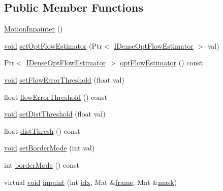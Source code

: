 \subsection*{Public Member Functions}
\begin{DoxyCompactItemize}
\item 
\hyperlink{classcv_1_1videostab_1_1MotionInpainter_aebf592dca89ac5e3f3cf94180b1fcad4}{Motion\-Inpainter} ()
\item 
\hyperlink{legacy_8hpp_a8bb47f092d473522721002c86c13b94e}{void} \hyperlink{classcv_1_1videostab_1_1MotionInpainter_ab6613bb5eccf19f8cc13154ea8af39af}{set\-Opt\-Flow\-Estimator} (Ptr$<$ \hyperlink{classcv_1_1videostab_1_1IDenseOptFlowEstimator}{I\-Dense\-Opt\-Flow\-Estimator} $>$ val)
\item 
Ptr$<$ \hyperlink{classcv_1_1videostab_1_1IDenseOptFlowEstimator}{I\-Dense\-Opt\-Flow\-Estimator} $>$ \hyperlink{classcv_1_1videostab_1_1MotionInpainter_abb0547dd07225cc24ff88586febb324c}{opt\-Flow\-Estimator} () const 
\item 
\hyperlink{legacy_8hpp_a8bb47f092d473522721002c86c13b94e}{void} \hyperlink{classcv_1_1videostab_1_1MotionInpainter_a3421c028fcdc3646969be927d5b6a0e7}{set\-Flow\-Error\-Threshold} (float val)
\item 
float \hyperlink{classcv_1_1videostab_1_1MotionInpainter_a04571e4969838ec9bdd6410bc0e65954}{flow\-Error\-Threshold} () const 
\item 
\hyperlink{legacy_8hpp_a8bb47f092d473522721002c86c13b94e}{void} \hyperlink{classcv_1_1videostab_1_1MotionInpainter_acec803125f370bd1708fdf72b560f656}{set\-Dist\-Threshold} (float val)
\item 
float \hyperlink{classcv_1_1videostab_1_1MotionInpainter_a1b9ea69ae2d5dd7136ca5b4b1e184cac}{dist\-Thresh} () const 
\item 
\hyperlink{legacy_8hpp_a8bb47f092d473522721002c86c13b94e}{void} \hyperlink{classcv_1_1videostab_1_1MotionInpainter_aaacb52b91f791b467b0e3f69a7ad80f5}{set\-Border\-Mode} (int val)
\item 
int \hyperlink{classcv_1_1videostab_1_1MotionInpainter_acf6a6030b06b18161081a3f78ef98354}{border\-Mode} () const 
\item 
virtual \hyperlink{legacy_8hpp_a8bb47f092d473522721002c86c13b94e}{void} \hyperlink{classcv_1_1videostab_1_1MotionInpainter_afba46eece84bf03a5b284e31f75cb551}{inpaint} (int \hyperlink{core__c_8h_a5c7c842f447336aa2f10826df65a28b3}{idx}, Mat \&\hyperlink{core__c_8h_a0430deaafd9043e478f306e33961299d}{frame}, Mat \&\hyperlink{tracking_8hpp_a6b13ecd2fd6ec7ad422f1d7863c3ad19}{mask})
\end{DoxyCompactItemize}
